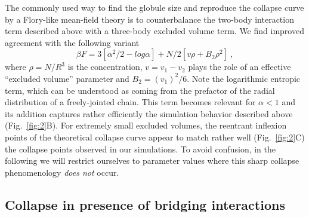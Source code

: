 \documentclass[
preprint,
a4paper,
12pt,
superscriptaddress,
pre]{revtex4}
\begin{document}
% 
The commonly used way to find the globule size and reproduce the
collapse curve by a Flory-like mean-field theory is to counterbalance
the two-body interaction term described above with a three-body
excluded volume term. We find improved agreement with the following
variant~\cite{DeGennes1975}
  \begin{equation}
    \beta F = 3 [\alpha^2/2 - log \alpha] + N/2 [v \rho  + B_2 \rho^2 ] \ ,
    \label{eq:deg_mfield}
\end{equation}
where $\rho = N/R^3$ is the concentration, $v = v_1 - v_2$ plays the
role of an effective ``excluded volume'' parameter and $B_2 = (v_1)^2
/ 6$. Note the logarithmic entropic term, which can be understood as
coming from the prefactor of the radial distribution of a
freely-jointed chain.
%
%
This term becomes relevant for $\alpha < 1$ and its addition captures
rather efficiently the simulation behavior described above
(Fig.~\ref{fig:2}B).  For extremely small excluded volumes,  the
reentrant inflexion points of the theoretical collapse curve appear to
match rather well (Fig.~\ref{fig:2}C) the collapse points observed
in our simulations. To avoid confusion, in the following we will
restrict ourselves to parameter values where this sharp collapse
phenomenology \emph{does not} occur.



\subsection*{Collapse in presence of bridging interactions}
\end{document}
